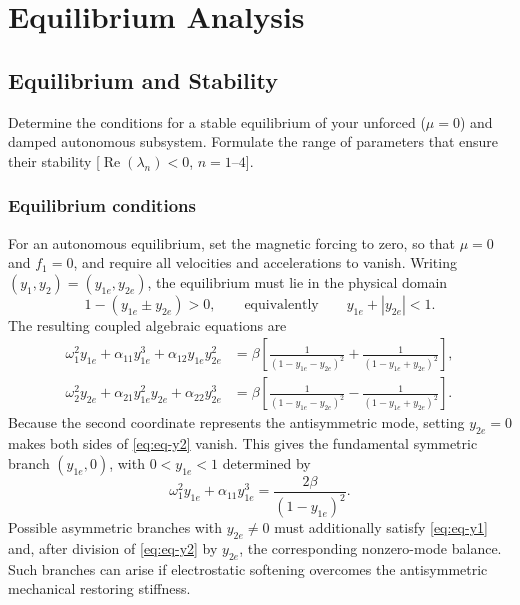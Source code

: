 \documentclass[11pt]{article}
\newenvironment{assignmentinstruction}{\par\begingroup\color{blue}}{\par\endgroup}
\begin{document}
\section{Equilibrium Analysis}
\subsection{Equilibrium and Stability}
\begin{assignmentinstruction}
Determine the conditions for a stable equilibrium of your unforced ($\mu=0$) and damped autonomous subsystem. Formulate the range of parameters that ensure their stability [$\operatorname{Re}(\lambda_n)<0$, $n=1$--$4$].
\end{assignmentinstruction}

\subsubsection*{Equilibrium conditions}
For an autonomous equilibrium, set the magnetic forcing to zero, so that $\mu=0$ and $f_1=0$, and require all velocities and accelerations to vanish. Writing $(y_1,y_2)=(y_{1e},y_{2e})$, the equilibrium must lie in the physical domain
\[
1-(y_{1e}\pm y_{2e})>0,
\qquad\text{equivalently}\qquad y_{1e}+|y_{2e}|<1.
\]
The resulting coupled algebraic equations are
\begin{align}
\omega_1^2 y_{1e}+\alpha_{11}y_{1e}^3+\alpha_{12}y_{1e}y_{2e}^2
&=\beta\left[\frac{1}{(1-y_{1e}-y_{2e})^2}+\frac{1}{(1-y_{1e}+y_{2e})^2}\right],\label{eq:eq-y1}\\
\omega_2^2 y_{2e}+\alpha_{21}y_{1e}^2y_{2e}+\alpha_{22}y_{2e}^3
&=\beta\left[\frac{1}{(1-y_{1e}-y_{2e})^2}-\frac{1}{(1-y_{1e}+y_{2e})^2}\right].\label{eq:eq-y2}
\end{align}
Because the second coordinate represents the antisymmetric mode, setting $y_{2e}=0$ makes both sides of \eqref{eq:eq-y2} vanish. This gives the fundamental symmetric branch $(y_{1e},0)$, with $0<y_{1e}<1$ determined by
\begin{equation}\label{eq:symmetric-equilibrium}
\omega_1^2 y_{1e}+\alpha_{11}y_{1e}^3=\frac{2\beta}{(1-y_{1e})^2}.
\end{equation}
Possible asymmetric branches with $y_{2e}\ne0$ must additionally satisfy \eqref{eq:eq-y1} and, after division of \eqref{eq:eq-y2} by $y_{2e}$, the corresponding nonzero-mode balance. Such branches can arise if electrostatic softening overcomes the antisymmetric mechanical restoring stiffness.
\end{document}
